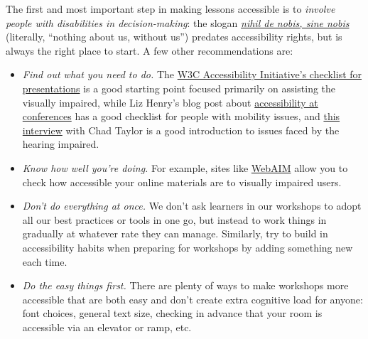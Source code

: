 The first and most important step in making lessons accessible is
to \emph{involve people with disabilities in decision-making}: the
slogan \emph{\href{https://en.wikipedia.org/wiki/Nothing\_About\_Us\_Without\_Us}{nihil
de nobis, sine nobis}} (literally, ``nothing about us, without us'')
predates accessibility rights, but is always the right place to start.
A few other recommendations are:

\begin{itemize}

\item
  \emph{Find out what you need to do.}
  The \href{http://www.w3.org/WAI/training/accessible}{W3C
  Accessibility Initiative's checklist for presentations} is a good
  starting point focused primarily on assisting the visually impaired,
  while Liz Henry's blog post
  about \href{https://modelviewculture.com/pieces/unlocking-the-invisible-elevator-accessibility-at-tech-conferences}{accessibility
  at conferences} has a good checklist for people with mobility
  issues,
  and \href{https://modelviewculture.com/pieces/qa-making-tech-events-accessible-to-the-deaf-community}{this
  interview} with Chad Taylor is a good introduction to issues faced
  by the hearing impaired.

\item
  \emph{Know how well you're doing.} For example, sites
  like \href{http://webaim.org/}{WebAIM} allow you to check how
  accessible your online materials are to visually impaired users.

\item
  \emph{Don't do everything at once.} We don't ask learners in our
  workshops to adopt all our best practices or tools in one go, but
  instead to work things in gradually at whatever rate they can
  manage.  Similarly, try to build in accessibility habits when
  preparing for workshops by adding something new each time.

\item
  \emph{Do the easy things first.} There are plenty of ways to make
  workshops more accessible that are both easy and don't create extra
  cognitive load for anyone: font choices, general text size, checking
  in advance that your room is accessible via an elevator or ramp,
  etc.

\end{itemize}



